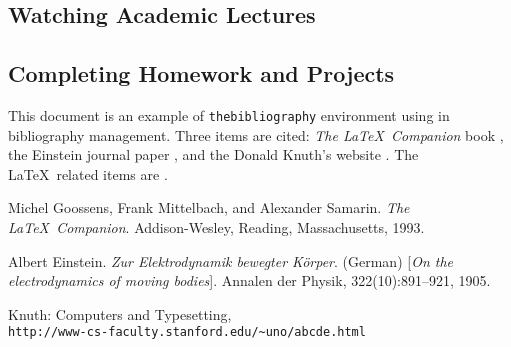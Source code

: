 \documentclass[11pt]{article} %
\begin{document}
\subsection{Watching Academic Lectures}
\subsection{Completing Homework and Projects}

This document is an example of \texttt{thebibliography} environment using 
in bibliography management. Three items are cited: \textit{The \LaTeX\ Companion} 
book \cite{latexcompanion}, the Einstein journal paper \cite{einstein}, and the 
Donald Knuth's website \cite{knuthwebsite}. The \LaTeX\ related items are
\cite{latexcompanion,knuthwebsite}.

\medskip
 
\begin{thebibliography}{9}
Michel Goossens, Frank Mittelbach, and Alexander Samarin. 
\textit{The \LaTeX\ Companion}. 
Addison-Wesley, Reading, Massachusetts, 1993.
 
Albert Einstein. 
\textit{Zur Elektrodynamik bewegter K{\"o}rper}. (German) 
[\textit{On the electrodynamics of moving bodies}]. 
Annalen der Physik, 322(10):891–921, 1905.
 
Knuth: Computers and Typesetting,
\\\texttt{http://www-cs-faculty.stanford.edu/\~{}uno/abcde.html}
\end{thebibliography}
\end{document}
